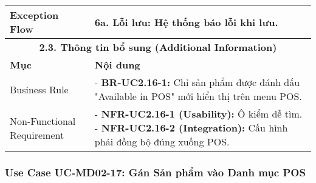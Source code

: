 \begin{longtable}{|m{4cm}|p{11cm}|}
\hline
Exception Flow & \textbf{6a. Lỗi lưu:} Hệ thống báo lỗi khi lưu. \\
\hline
\multicolumn{2}{|c|}{\textbf{2.3. Thông tin bổ sung (Additional Information)}} \\
\hline
\textbf{Mục} & \textbf{Nội dung} \\
\hline
Business Rule & - \textbf{BR-UC2.16-1:} Chỉ sản phẩm được đánh dấu "Available in POS" mới hiển thị trên menu POS. \\
\hline
Non-Functional Requirement & - \textbf{NFR-UC2.16-1 (Usability):} Ô kiểm dễ tìm. \newline - \textbf{NFR-UC2.16-2 (Integration):} Cấu hình phải đồng bộ đúng xuống POS. \\
\hline
\end{longtable}

\subsubsection{Use Case UC-MD02-17: Gán Sản phẩm vào Danh mục POS}

